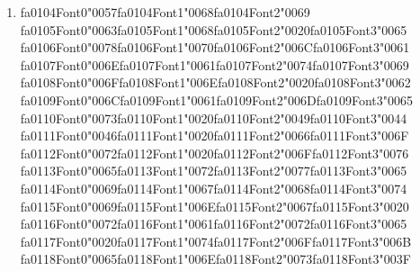 \documentclass[12pt]{article}
\begin{document}
\begin{enumerate}[label=Q\arabic*.]
 \begin{enumerate}[label=(\Alph*)]
     \item The model stores all observed word pairs explicitly
     \item Embeddings capture semantics that combine compositionally
     \item The softmax layer guarantees coverage of unseen sequences
     \item Training implicitly includes all possible word permutations
 \end{enumerate}
 
 \item {\csname fa0104Font0\endcsname\char"0057}{\csname fa0104Font1\endcsname\char"0068}{\csname fa0104Font2\endcsname\char"0069} {\csname fa0105Font0\endcsname\char"0063}{\csname fa0105Font1\endcsname\char"0068}{\csname fa0105Font2\endcsname\char"0020}{\csname fa0105Font3\endcsname\char"0065} {\csname fa0106Font0\endcsname\char"0078}{\csname fa0106Font1\endcsname\char"0070}{\csname fa0106Font2\endcsname\char"006C}{\csname fa0106Font3\endcsname\char"0061} {\csname fa0107Font0\endcsname\char"006E}{\csname fa0107Font1\endcsname\char"0061}{\csname fa0107Font2\endcsname\char"0074}{\csname fa0107Font3\endcsname\char"0069} {\csname fa0108Font0\endcsname\char"006F}{\csname fa0108Font1\endcsname\char"006E}{\csname fa0108Font2\endcsname\char"0020}{\csname fa0108Font3\endcsname\char"0062} {\csname fa0109Font0\endcsname\char"006C}{\csname fa0109Font1\endcsname\char"0061}{\csname fa0109Font2\endcsname\char"006D}{\csname fa0109Font3\endcsname\char"0065} {\csname fa0110Font0\endcsname\char"0073}{\csname fa0110Font1\endcsname\char"0020}{\csname fa0110Font2\endcsname\char"0049}{\csname fa0110Font3\endcsname\char"0044} {\csname fa0111Font0\endcsname\char"0046}{\csname fa0111Font1\endcsname\char"0020}{\csname fa0111Font2\endcsname\char"0066}{\csname fa0111Font3\endcsname\char"006F} {\csname fa0112Font0\endcsname\char"0072}{\csname fa0112Font1\endcsname\char"0020}{\csname fa0112Font2\endcsname\char"006F}{\csname fa0112Font3\endcsname\char"0076} {\csname fa0113Font0\endcsname\char"0065}{\csname fa0113Font1\endcsname\char"0072}{\csname fa0113Font2\endcsname\char"0077}{\csname fa0113Font3\endcsname\char"0065} {\csname fa0114Font0\endcsname\char"0069}{\csname fa0114Font1\endcsname\char"0067}{\csname fa0114Font2\endcsname\char"0068}{\csname fa0114Font3\endcsname\char"0074} {\csname fa0115Font0\endcsname\char"0069}{\csname fa0115Font1\endcsname\char"006E}{\csname fa0115Font2\endcsname\char"0067}{\csname fa0115Font3\endcsname\char"0020} {\csname fa0116Font0\endcsname\char"0072}{\csname fa0116Font1\endcsname\char"0061}{\csname fa0116Font2\endcsname\char"0072}{\csname fa0116Font3\endcsname\char"0065} {\csname fa0117Font0\endcsname\char"0020}{\csname fa0117Font1\endcsname\char"0074}{\csname fa0117Font2\endcsname\char"006F}{\csname fa0117Font3\endcsname\char"006B} {\csname fa0118Font0\endcsname\char"0065}{\csname fa0118Font1\endcsname\char"006E}{\csname fa0118Font2\endcsname\char"0073}{\csname fa0118Font3\endcsname\char"003F}

\end{enumerate}
\end{document}
